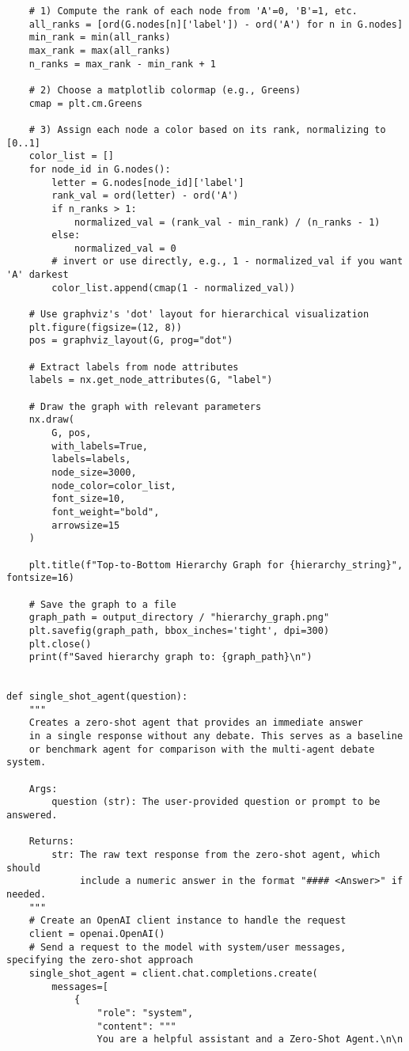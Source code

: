 \begin{lstlisting}
    # 1) Compute the rank of each node from 'A'=0, 'B'=1, etc.
    all_ranks = [ord(G.nodes[n]['label']) - ord('A') for n in G.nodes]
    min_rank = min(all_ranks)
    max_rank = max(all_ranks)
    n_ranks = max_rank - min_rank + 1

    # 2) Choose a matplotlib colormap (e.g., Greens)
    cmap = plt.cm.Greens

    # 3) Assign each node a color based on its rank, normalizing to [0..1]
    color_list = []
    for node_id in G.nodes():
        letter = G.nodes[node_id]['label']
        rank_val = ord(letter) - ord('A')
        if n_ranks > 1:
            normalized_val = (rank_val - min_rank) / (n_ranks - 1)
        else:
            normalized_val = 0
        # invert or use directly, e.g., 1 - normalized_val if you want 'A' darkest
        color_list.append(cmap(1 - normalized_val))

    # Use graphviz's 'dot' layout for hierarchical visualization
    plt.figure(figsize=(12, 8))
    pos = graphviz_layout(G, prog="dot")

    # Extract labels from node attributes
    labels = nx.get_node_attributes(G, "label")

    # Draw the graph with relevant parameters
    nx.draw(
        G, pos,
        with_labels=True,
        labels=labels,
        node_size=3000,
        node_color=color_list,
        font_size=10,
        font_weight="bold",
        arrowsize=15
    )

    plt.title(f"Top-to-Bottom Hierarchy Graph for {hierarchy_string}", fontsize=16)

    # Save the graph to a file
    graph_path = output_directory / "hierarchy_graph.png"
    plt.savefig(graph_path, bbox_inches='tight', dpi=300)
    plt.close()
    print(f"Saved hierarchy graph to: {graph_path}\n")


def single_shot_agent(question):
    """
    Creates a zero-shot agent that provides an immediate answer
    in a single response without any debate. This serves as a baseline
    or benchmark agent for comparison with the multi-agent debate system.

    Args:
        question (str): The user-provided question or prompt to be answered.

    Returns:
        str: The raw text response from the zero-shot agent, which should
             include a numeric answer in the format "#### <Answer>" if needed.
    """
    # Create an OpenAI client instance to handle the request
    client = openai.OpenAI()
    # Send a request to the model with system/user messages, specifying the zero-shot approach
    single_shot_agent = client.chat.completions.create(
        messages=[
            {
                "role": "system",
                "content": """
                You are a helpful assistant and a Zero-Shot Agent.\n\n


\end{lstlisting}
